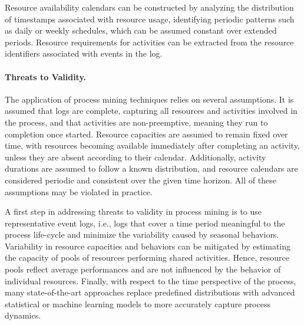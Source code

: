 Resource availability calendars can be constructed by analyzing the distribution of timestamps associated with resource usage, identifying periodic patterns such as daily or weekly schedules, which can be assumed constant over extended 
periods. Resource requirements for activities can be extracted from the resource identifiers associated with events in the log. 


\paragraph{Threats to Validity.} The application of process mining techniques relies on several assumptions. It is assumed that logs are complete, capturing all resources and activities involved in the process, and that activities are non-preemptive, meaning they run to completion once started. Resource capacities are assumed to remain fixed over time, with resources becoming available immediately after completing an activity, unless they are absent according to their calendar. Additionally, activity durations are assumed to follow a known distribution, and resource calendars are considered periodic and consistent over the given time horizon. All of these assumptions may be violated in practice. 

A first step in addressing threats to validity in process mining is to use representative event logs, i.e., logs that cover a time period meaningful to the process life-cycle and minimize the variability caused by seasonal behaviors. Variability in resource capacities and behaviors can be mitigated by estimating the capacity of pools of resources performing shared activities. Hence, resource pools reflect average performances and are not influenced by the behavior of individual resources. Finally, with respect to the
time perspective of the process, many state-of-the-art approaches replace predefined distributions with advanced statistical or machine learning models to more accurately capture process dynamics.


